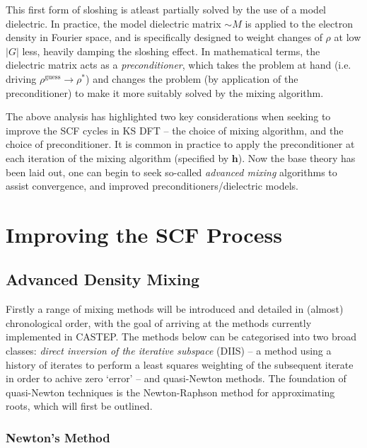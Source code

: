 This first form of sloshing is atleast partially solved by the use of a model dielectric. In practice, the model dielectric matrix $\sim M$ is applied to the electron density in Fourier space, and is specifically designed to weight changes of $\rho$ at low $|G|$ less, heavily damping the sloshing effect. In mathematical terms, the dielectric matrix acts as a \textit{preconditioner}, which takes the problem at hand (i.e. driving $\rho^{\text{guess}} \rightarrow \rho^*$) and changes the problem (by application of the preconditioner) to make it more suitably solved by the mixing algorithm.

The above analysis has highlighted two key considerations when seeking to improve the SCF cycles in KS DFT -- the choice of mixing algorithm, and the choice of preconditioner. It is common in practice to apply the preconditioner at each iteration of the mixing algorithm (specified by $\textbf{h}$). Now the base theory has been laid out, one can begin to seek so-called \textit{advanced mixing} algorithms to assist convergence, and improved preconditioners/dielectric models. 




\section{Improving the SCF Process}

\subsection{Advanced Density Mixing}

Firstly a range of mixing methods will be introduced and detailed in (almost) chronological order, with the goal of arriving at the methods currently implemented in CASTEP. The methods below can be categorised into two broad classes: \textit{direct inversion of the iterative subspace} (DIIS) -- a method using a history of iterates to perform a least squares weighting of the subsequent iterate in order to achive zero `error' -- and quasi-Newton methods. The foundation of quasi-Newton techniques is the Newton-Raphson method for approximating roots, which will first be outlined. 

\subsubsection{Newton's Method}

